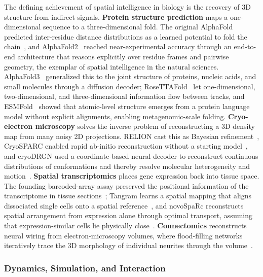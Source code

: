 The defining achievement of spatial intelligence in biology is the recovery of 3D structure from indirect signals.
\textbf{Protein structure prediction} maps a one-dimensional sequence to a three-dimensional fold.
The original AlphaFold predicted inter-residue distance distributions as a learned potential to fold the chain~\cite{senior2020improved}, and AlphaFold2~\cite{jumper2021highly} reached near-experimental accuracy through an end-to-end architecture that reasons explicitly over residue frames and pairwise geometry, the exemplar of spatial intelligence in the natural sciences.
AlphaFold3~\cite{abramson2024accurate} generalized this to the joint structure of proteins, nucleic acids, and small molecules through a diffusion decoder; RoseTTAFold~\cite{baek2021accurate} let one-dimensional, two-dimensional, and three-dimensional information flow between tracks, and ESMFold~\cite{lin2023evolutionary} showed that atomic-level structure emerges from a protein language model without explicit alignments, enabling metagenomic-scale folding.
\textbf{Cryo-electron microscopy} solves the inverse problem of reconstructing a 3D density map from many noisy 2D projections.
RELION cast this as Bayesian refinement~\cite{scheres2012relion}, CryoSPARC enabled rapid ab-initio reconstruction without a starting model~\cite{punjani2017cryosparc}, and cryoDRGN used a coordinate-based neural decoder to reconstruct continuous distributions of conformations and thereby resolve molecular heterogeneity and motion~\cite{zhong2021cryodrgn}.
\textbf{Spatial transcriptomics} places gene expression back into tissue space.
The founding barcoded-array assay preserved the positional information of the transcriptome in tissue sections~\cite{stahl2016visualization}; Tangram learns a spatial mapping that aligns dissociated single cells onto a spatial reference~\cite{biancalani2021deep}, and novoSpaRc reconstructs spatial arrangement from expression alone through optimal transport, assuming that expression-similar cells lie physically close~\cite{nitzan2019gene}.
\textbf{Connectomics} reconstructs neural wiring from electron-microscopy volumes, where flood-filling networks iteratively trace the 3D morphology of individual neurites through the volume~\cite{januszewski2018high}.

\subsubsection{Dynamics, Simulation, and Interaction}


